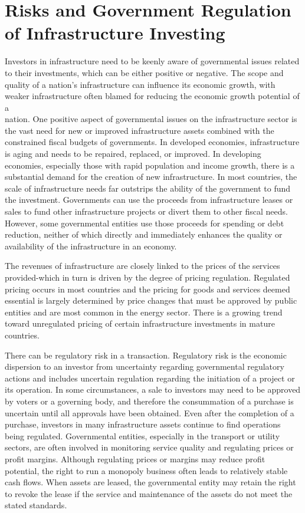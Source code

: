 \documentclass[11pt]{article}
\begin{document}
\section*{Risks and Government Regulation of Infrastructure Investing}
Investors in infrastructure need to be keenly aware of governmental issues related to their investments, which can be either positive or negative. The scope and quality of a nation's infrastructure can influence its economic growth, with weaker infrastructure often blamed for reducing the economic growth potential of a\\
nation. One positive aspect of governmental issues on the infrastructure sector is the vast need for new or improved infrastructure assets combined with the constrained fiscal budgets of governments. In developed economies, infrastructure is aging and needs to be repaired, replaced, or improved. In developing economies, especially those with rapid population and income growth, there is a substantial demand for the creation of new infrastructure. In most countries, the scale of infrastructure needs far outstrips the ability of the government to fund the investment. Governments can use the proceeds from infrastructure leases or sales to fund other infrastructure projects or divert them to other fiscal needs. However, some governmental entities use those proceeds for spending or debt reduction, neither of which directly and immediately enhances the quality or availability of the infrastructure in an economy.

The revenues of infrastructure are closely linked to the prices of the services provided-which in turn is driven by the degree of pricing regulation. Regulated pricing occurs in most countries and the pricing for goods and services deemed essential is largely determined by price changes that must be approved by public entities and are most common in the energy sector. There is a growing trend toward unregulated pricing of certain infrastructure investments in mature countries.

There can be regulatory risk in a transaction. Regulatory risk is the economic dispersion to an investor from uncertainty regarding governmental regulatory actions and includes uncertain regulation regarding the initiation of a project or its operation. In some circumstances, a sale to investors may need to be approved by voters or a governing body, and therefore the consummation of a purchase is uncertain until all approvals have been obtained. Even after the completion of a purchase, investors in many infrastructure assets continue to find operations being regulated. Governmental entities, especially in the transport or utility sectors, are often involved in monitoring service quality and regulating prices or profit margins. Although regulating prices or margins may reduce profit potential, the right to run a monopoly business often leads to relatively stable cash flows. When assets are leased, the governmental entity may retain the right to revoke the lease if the service and maintenance of the assets do not meet the stated standards.
\end{document}
